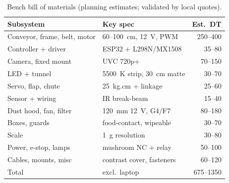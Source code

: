 \documentclass[10pt,conference,a4paper]{IEEEtran}
\begin{document}
\begin{table}[htbp]
\caption{Bench bill of materials (planning estimates; validated by local quotes).}
\label{tab:bom}
\centering
\begin{tabular}{@{}llr@{}}
\toprule
Subsystem & Key spec & Est.~DT \\
\midrule
Conveyor, frame, belt, motor & 60--100~cm, 12~V, PWM & 250--400 \\
Controller + driver & ESP32 + L298N/MX1508 & 35--80 \\
Camera, fixed mount & UVC 720p+ & 70--150 \\
LED + tunnel & 5500~K strip, 30~cm matte & 30--70 \\
Servo, flap, chute & 25~kg.cm + linkage & 25--60 \\
Sensor + wiring & IR break-beam & 15--40 \\
Dust hood, fan, filter & 120~mm 12~V, G4/F7 & 80--180 \\
Boxes, guards & food-contact, wipeable & 30--70 \\
Scale & 1~g resolution & 30--80 \\
Power, e-stop, lamps & mushroom NC + relay & 50--100 \\
Cables, mounts, misc & contrast cover, fasteners & 60--120 \\
\midrule
Total & excl.~laptop & 675--1350 \\
\bottomrule
\end{tabular}
\end{table}
\end{document}
